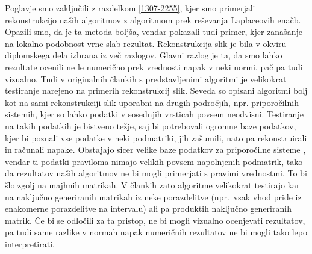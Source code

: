 Poglavje smo zaključili z razdelkom \ref{1307-2255}, kjer smo primerjali rekonstrukcijo naših algoritmov z algoritmom prek reševanja Laplaceovih enačb. Opazili smo, da je ta metoda boljša, vendar pokazali tudi primer, kjer zanašanje na lokalno podobnost vrne slab rezultat. Rekonstrukcija slik je bila v okviru diplomskega dela izbrana iz več razlogov. Glavni razlog je ta, da smo lahko rezultate ocenili ne le numerično prek vrednosti napak v neki normi, pač pa tudi vizualno. Tudi v originalnih člankih s predstavljenimi algoritmi je velikokrat testiranje narejeno na primerih rekonstrukcij slik.
Seveda so opisani algoritmi bolj kot na sami rekonstrukciji slik uporabni na drugih področjih, npr. priporočilnih sistemih, kjer so lahko podatki v sosednjih vrsticah povsem neodvisni. Testiranje na takih podatkih je bistveno težje, saj bi potrebovali ogromne baze podatkov, kjer bi poznali vse podatke v neki podmatriki, jih zašumili, nato pa rekonstruirali in računali napake. Obstajajo sicer velike baze podatkov za priporočilne sisteme , vendar ti podatki praviloma nimajo velikih povsem napolnjenih podmatrik, tako da rezultatov naših algoritmov ne bi mogli primerjati s pravimi vrednostmi. To bi šlo zgolj na majhnih matrikah. V člankih zato algoritme velikokrat testirajo kar na naključno generiranih matrikah iz neke porazdelitve (npr.\ vsak vhod pride iz enakomerne porazdelitve na intervalu) ali pa produktih naključno generiranih matrik. Če bi se odločili za ta pristop, ne bi mogli vizualno ocenjevati rezultatov, pa tudi same razlike v normah napak numeričnih rezultatov ne bi mogli tako lepo interpretirati.